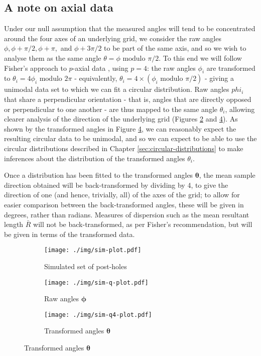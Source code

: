 \documentclass[../../ArchStats.tex]{subfiles}
\begin{document}
\subsection{A note on axial data}
Under our null assumption that the measured angles will tend to be concentrated around the four axes of an underlying grid, we consider the raw angles $\phi, \phi + \pi/2, \phi + \pi,$ and $\phi + 3\pi/2$ to be part of the same axis, and so we wish to analyse them as the same angle $\theta = \phi \text{ modulo }\pi/2$.
To this end we will follow Fisher's approach to $p$-axial data \cite{Fisher1993}, using $p=4$: the raw angles $\phi_i$ are transformed to $\theta_i = 4\phi_i \text{ modulo } 2\pi$ - equivalently, $\theta_i = 4 \times (\phi_i \text{ modulo }\pi/2)$ - giving a unimodal data set to which we can fit a circular distribution. Raw angles $phi_i$ that share a perpendicular orientation - that is, angles that are directly opposed or perpendicular to one another - are thus mapped to the same angle $\theta_i$, allowing clearer analysis of the direction of the underlying grid (Figures \ref{fig:sim-q-plot} and \ref{fig:sim-q4-plot}). As shown by the transformed angles in Figure \ref{fig:sim-q4-plot}, we can reasonably expect the resulting circular data to be unimodal, and so we can expect to be able to use the circular distributions described in Chapter \ref{sec:circular-distributions} to make inferences about the distribution of the transformed angles $\theta_i$.

Once a distribution has been fitted to the transformed angles $\mathbf{\theta}$, the mean sample direction obtained will be back-transformed by dividing by 4, to give the direction of one (and hence, trivially, all) of the axes of the grid; to allow for easier comparison between the back-transformed angles, these will be given in degrees, rather than radians. Measures of dispersion such as the mean resultant length $\bar{R}$ will not be back-transformed, as per Fisher's recommendation, but will be given in terms of the transformed data.

\begin{figure}[h!]
\centering
\caption{Simulated set of post-holes 1m apart, with Gaussian $N(0,0.1)$ perturbation, and associated angles }
\begin{subfigure}[t]{0.38\textwidth}
\caption{Simulated set of post-holes}
\label{fig:sim-plot}
\texttt{[image: ./img/sim-plot.pdf]}
\end{subfigure}
\begin{subfigure}[t]{0.3\textwidth}
\caption{Raw angles $\mathbf{\phi}$}
\label{fig:sim-q-plot}
\texttt{[image: ./img/sim-q-plot.pdf]}
\end{subfigure}
\begin{subfigure}[t]{0.3\textwidth}
\caption{Transformed angles $\mathbf{\theta}$}
\label{fig:sim-q4-plot}
\texttt{[image: ./img/sim-q4-plot.pdf]}
\end{subfigure}
\end{figure}
\end{document}
